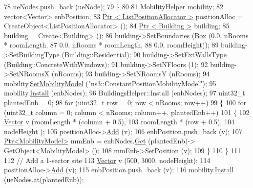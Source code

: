 \begin{DoxyCode}
78       ueNodes.push\_back (ueNode);
79     \}
80 
81   \hyperlink{classns3_1_1MobilityHelper}{MobilityHelper} mobility;
82   vector<Vector> enbPosition;
83   \hyperlink{classns3_1_1Ptr}{Ptr < ListPositionAllocator >} positionAlloc = 
      CreateObject<ListPositionAllocator> ();
84   \hyperlink{classns3_1_1Ptr}{Ptr < Building >} building;
85   building = Create<Building> ();
86   building->SetBoundaries (\hyperlink{classns3_1_1Box}{Box} (0.0, nRooms * roomLength,
87                                 0.0, nRooms * roomLength,
88                                 0.0, roomHeight));
89   building->SetBuildingType (Building::Residential);
90   building->SetExtWallsType (Building::ConcreteWithWindows);
91   building->SetNFloors (1);
92   building->SetNRoomsX (nRooms);
93   building->SetNRoomsY (nRooms);
94   mobility.\hyperlink{classns3_1_1MobilityHelper_a030275011b6f40682e70534d30280aba}{SetMobilityModel} (\textcolor{stringliteral}{"ns3::ConstantPositionMobilityModel"});
95   mobility.\hyperlink{classns3_1_1MobilityHelper_a07737960ee95c0777109cf2994dd97ae}{Install} (enbNodes);
96   BuildingsHelper::Install (enbNodes);
97   uint32\_t plantedEnb = 0;
98   \textcolor{keywordflow}{for} (uint32\_t row = 0; row < nRooms; row++)
99     \{
100       \textcolor{keywordflow}{for} (uint32\_t column = 0; column < nRooms; column++, plantedEnb++)
101         \{
102           \hyperlink{classns3_1_1Vector3D_a7e59b47bc94c9cb1dadff68c1d0112d8}{Vector} v (roomLength * (column + 0.5),
103                     roomLength * (row + 0.5),
104                     nodeHeight );
105           positionAlloc->\hyperlink{classns3_1_1ListPositionAllocator_a460e82f015ac012a73ba0ea0cccb3486}{Add} (v);
106           enbPosition.push\_back (v);
107           \hyperlink{classns3_1_1Ptr}{Ptr<MobilityModel>} mmEnb = enbNodes.\hyperlink{classns3_1_1NodeContainer_a9ed96e2ecc22e0f5a3d4842eb9bf90bf}{Get} (plantedEnb)->
      \hyperlink{classns3_1_1Object_a13e18c00017096c8381eb651d5bd0783}{GetObject}<\hyperlink{classns3_1_1MobilityModel}{MobilityModel}> ();
108           mmEnb->\hyperlink{classns3_1_1MobilityModel_ac584b3d5a309709d2f13ed6ada1e7640}{SetPosition} (v);
109         \}
110     \}
111 
112   \textcolor{comment}{// Add a 1-sector site}
113   \hyperlink{classns3_1_1Vector3D_a7e59b47bc94c9cb1dadff68c1d0112d8}{Vector} v (500, 3000, nodeHeight);
114   positionAlloc->\hyperlink{classns3_1_1ListPositionAllocator_a460e82f015ac012a73ba0ea0cccb3486}{Add} (v);
115   enbPosition.push\_back (v);
116   mobility.\hyperlink{classns3_1_1MobilityHelper_a07737960ee95c0777109cf2994dd97ae}{Install} (ueNodes.at(plantedEnb));

\end{DoxyCode}
